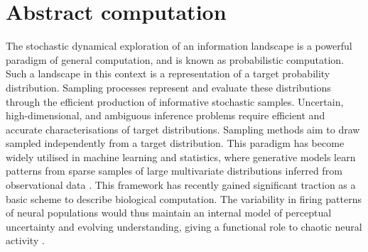 \section{Abstract computation}\label{sec:comp_sampling}
The stochastic dynamical exploration of an information landscape is a powerful paradigm of general computation, and is known as probabilistic computation. Such a landscape in this context is a representation of a target probability distribution. Sampling processes represent and evaluate these distributions through the efficient production of informative stochastic samples. Uncertain, high-dimensional, and ambiguous inference problems require efficient and accurate characterisations of target distributions. Sampling methods aim to draw sampled independently from a target distribution. This paradigm has become widely utilised in machine learning and statistics, where generative models learn patterns from sparse samples of large multivariate distributions inferred from observational data \cite{delacour_neural_1997, cranmer_advances_2023}. This framework has recently gained significant traction as a basic scheme to describe biological computation. The variability in firing patterns of neural populations would thus maintain an internal model of perceptual uncertainty and evolving understanding, giving a functional role to chaotic neural activity \cite{rao_predictive_1999, koch_predicting_1999, lange_bayesian_2020}.
